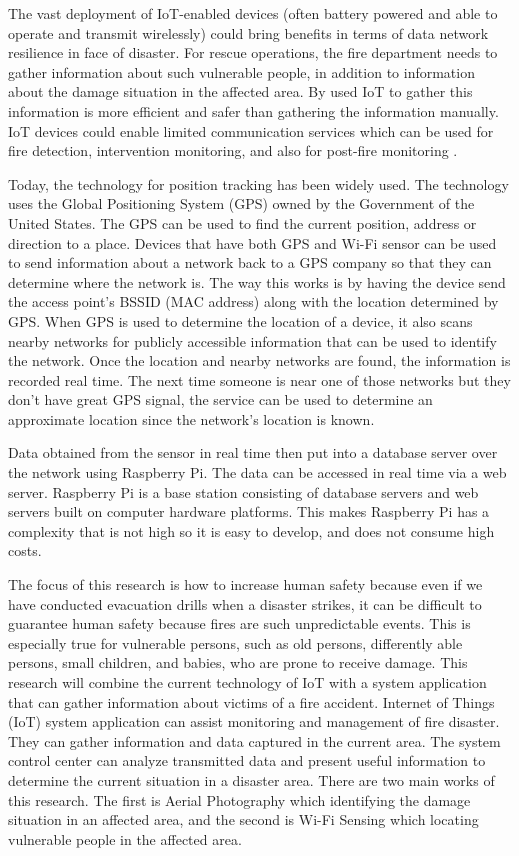 \documentclass[twocolumn,10pt]{asme2ej}
\begin{document}
	The vast deployment of IoT-enabled devices (often battery powered and able to operate and transmit wirelessly) could bring benefits in terms of data network resilience in face of disaster. For rescue operations, the fire department needs to gather information about such vulnerable people, in addition to information about the damage situation in the affected area. By used IoT to gather this information is more efficient and safer than gathering the information manually. IoT devices could enable limited communication services which can be used for fire detection, intervention monitoring, and also for post-fire monitoring \cite{Restas} \cite{Zeinab}.
	
	Today, the technology for position tracking has been widely used. The technology uses the Global Positioning System (GPS) owned by the Government of the United States. The GPS can be used to find the current position, address or direction to a place. Devices that have both GPS and Wi-Fi sensor can be used to send information about a network back to a GPS company so that they can determine where the network is. The way this works is by having the device send the access point's BSSID (MAC address) along with the location determined by GPS. When GPS is used to determine the location of a device, it also scans nearby networks for publicly accessible information that can be used to identify the network. Once the location and nearby networks are found, the information is recorded real time. The next time someone is near one of those networks but they don't have great GPS signal, the service can be used to determine an approximate location since the network's location is known\cite{Sheng}. 
	
	Data obtained from the sensor in real time then put into a database server over the network using Raspberry Pi. The data can be accessed in real time via a web server. Raspberry Pi is a base station consisting of database servers and web servers built on computer hardware platforms. This makes Raspberry Pi has a complexity that is not high so it is easy to develop, and does not consume high costs.
	
	The focus of this research is how to increase human safety because even if we have conducted evacuation drills when a disaster strikes, it can be difficult to guarantee human safety because fires are such unpredictable events. This is especially true for vulnerable persons, such as old persons, differently able persons, small children, and babies, who are prone to receive damage. This research will combine the current technology of IoT with a system application that can gather information about victims of a fire accident. Internet of Things (IoT) system application can assist monitoring and management of fire disaster. They can gather information and data captured in the current area. The system control center can analyze transmitted data and present useful information to determine the current situation in a disaster area. There are two main works of this research. The first is Aerial Photography which identifying the damage situation in an affected area, and the second is Wi-Fi Sensing which locating vulnerable people in the affected area.
	
\end{document}
